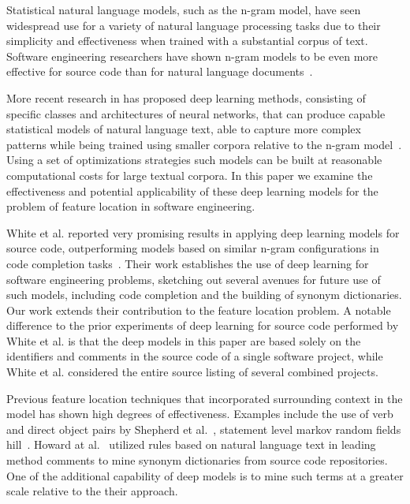


%
%
Statistical natural language models, such as the n-gram model, have
seen widespread use for a variety of natural language processing tasks
due to their simplicity and effectiveness when trained with a
substantial corpus of text. Software engineering researchers have
shown n-gram models to be even more effective for source code than for
natural language documents~\cite{hindle_naturalness_2012}. 


More recent research in has proposed deep learning methods, consisting
of specific classes and architectures of neural networks, that can
produce capable statistical models of natural language text, able to
capture more complex patterns while being trained using smaller
corpora relative to the n-gram
model~\cite{mikolov_distributed_2013,le_distributed_2014}. Using a set
of optimizations strategies such models can be built at reasonable
computational costs for large textual corpora. In this paper we
examine the effectiveness and potential applicability of these deep
learning models for the problem of feature location in software
engineering.



White et al. reported very promising results in applying deep learning
models for source code, outperforming models based on similar n-gram
configurations in code completion
tasks~\cite{white_toward_2015}. Their work establishes the use of deep
learning for software engineering problems, sketching out several
avenues for future use of such models, including code completion and
the building of synonym dictionaries. Our work extends their
contribution to the feature location problem. A notable difference to
the prior experiments of deep learning for source code performed by
White et al. is that the deep models in this paper are based solely on
the identifiers and comments in the source code of a single software
project, while White et al. considered the entire source listing of
several combined projects.





Previous feature location techniques that incorporated surrounding
context in the model has shown high degrees of effectiveness. Examples
include the use of verb and direct object pairs by Shepherd et
al.~\cite{shepherd_using_2007}, statement level markov random fields
hill~\cite{hill_use_2014}. Howard at
al.~\cite{howard_automatically_2013} utilized rules based on natural
language text in leading method comments to mine synonym dictionaries
from source code repositories. One of the additional capability of
deep models is to mine such terms at a greater scale relative to the
their approach.
